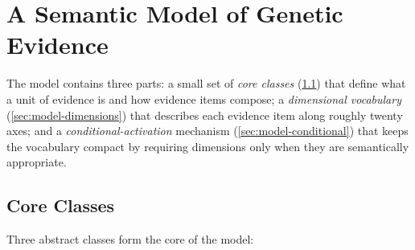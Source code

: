 %

\section{A Semantic Model of Genetic Evidence}
\label{sec:model}

The model contains three parts: a small set of \emph{core classes}
(\cref{sec:model-classes}) that define what a unit of evidence is and
how evidence items compose; a \emph{dimensional vocabulary}
(\cref{sec:model-dimensions}) that describes each evidence item along
roughly twenty axes; and a \emph{conditional-activation} mechanism
(\cref{sec:model-conditional}) that keeps the vocabulary compact by
requiring dimensions only when they are semantically appropriate.

\subsection{Core Classes}
\label{sec:model-classes}

Three abstract classes form the core of the model:

